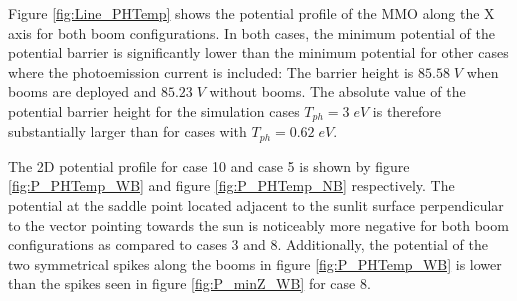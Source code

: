 Figure \ref{fig:Line_PHTemp} shows the potential profile of the MMO along the X axis for both boom configurations. In both cases, the minimum potential of the potential barrier is significantly lower than the minimum potential for other cases where the photoemission current is included: The barrier height is $85.58 \; V$ when booms are deployed and $85.23 \; V$ without booms. The absolute value of the potential barrier height for the simulation cases $T_{ph} = 3 \; eV$ is therefore substantially larger than for cases with $T_{ph} = 0.62 \; eV$. 

The 2D potential profile for case 10 and case 5 is shown by figure \ref{fig:P_PHTemp_WB} and figure \ref{fig:P_PHTemp_NB} respectively. The potential at the saddle point located adjacent to the sunlit surface perpendicular to the vector pointing towards the sun is noticeably more negative for both boom configurations as compared to cases 3 and 8. Additionally, the potential of the two symmetrical spikes along the booms in figure \ref{fig:P_PHTemp_WB} is lower than the spikes seen in figure \ref{fig:P_minZ_WB} for case 8.

